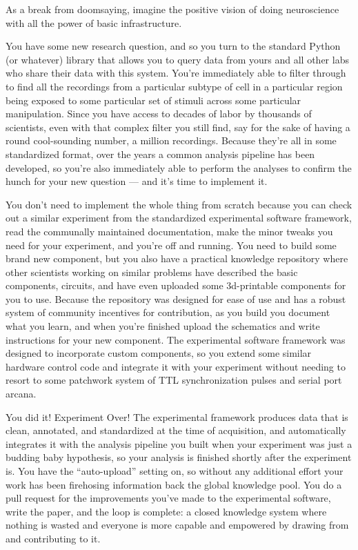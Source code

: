 \documentclass{article}
\begin{document}
As a break from doomsaying, imagine the positive vision of doing
neuroscience with all the power of basic infrastructure.

You have some new research question, and so you turn to the standard
Python (or whatever) library that allows you to query data from yours
and all other labs who share their data with this system. You're
immediately able to filter through to find all the recordings from a
particular subtype of cell in a particular region being exposed to some
particular set of stimuli across some particular manipulation. Since you
have access to decades of labor by thousands of scientists, even with
that complex filter you still find, say for the sake of having a round
cool-sounding number, a million recordings. Because they're all in some
standardized format, over the years a common analysis pipeline has been
developed, so you're also immediately able to perform the analyses to
confirm the hunch for your new question --- and it's time to implement
it.

You don't need to implement the whole thing from scratch because you can
check out a similar experiment from the standardized experimental
software framework, read the communally maintained documentation, make
the minor tweaks you need for your experiment, and you're off and
running. You need to build some brand new component, but you also have a
practical knowledge repository where other scientists working on similar
problems have described the basic components, circuits, and have even
uploaded some 3d-printable components for you to use. Because the
repository was designed for ease of use and has a robust system of
community incentives for contribution, as you build you document what
you learn, and when you're finished upload the schematics and write
instructions for your new component. The experimental software framework
was designed to incorporate custom components, so you extend some
similar hardware control code and integrate it with your experiment
without needing to resort to some patchwork system of TTL
synchronization pulses and serial port arcana.

You did it! Experiment Over! The experimental framework produces data
that is clean, annotated, and standardized at the time of acquisition,
and automatically integrates it with the analysis pipeline you built
when your experiment was just a budding baby hypothesis, so your
analysis is finished shortly after the experiment is. You have the
``auto-upload'' setting on, so without any additional effort your work
has been firehosing information back the global knowledge pool. You do a
pull request for the improvements you've made to the experimental
software, write the paper, and the loop is complete: a closed knowledge
system where nothing is wasted and everyone is more capable and
empowered by drawing from and contributing to it.
\end{document}
